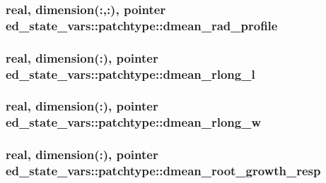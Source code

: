 \subsubsection[{\texorpdfstring{dmean\+\_\+rad\+\_\+profile}{dmean_rad_profile}}]{\setlength{\rightskip}{0pt plus 5cm}real, dimension(\+:,\+:), pointer ed\+\_\+state\+\_\+vars\+::patchtype\+::dmean\+\_\+rad\+\_\+profile}\hypertarget{structed__state__vars_1_1patchtype_a8aabb38e595edf404a57c53cf9128c8a}{}\label{structed__state__vars_1_1patchtype_a8aabb38e595edf404a57c53cf9128c8a}
\subsubsection[{\texorpdfstring{dmean\+\_\+rlong\+\_\+l}{dmean_rlong_l}}]{\setlength{\rightskip}{0pt plus 5cm}real, dimension(\+:), pointer ed\+\_\+state\+\_\+vars\+::patchtype\+::dmean\+\_\+rlong\+\_\+l}\hypertarget{structed__state__vars_1_1patchtype_a2c34274b4e10047a1940e79ca285d0f6}{}\label{structed__state__vars_1_1patchtype_a2c34274b4e10047a1940e79ca285d0f6}
\subsubsection[{\texorpdfstring{dmean\+\_\+rlong\+\_\+w}{dmean_rlong_w}}]{\setlength{\rightskip}{0pt plus 5cm}real, dimension(\+:), pointer ed\+\_\+state\+\_\+vars\+::patchtype\+::dmean\+\_\+rlong\+\_\+w}\hypertarget{structed__state__vars_1_1patchtype_a9e9e83d85741b0374632224fb8ee787e}{}\label{structed__state__vars_1_1patchtype_a9e9e83d85741b0374632224fb8ee787e}
\subsubsection[{\texorpdfstring{dmean\+\_\+root\+\_\+growth\+\_\+resp}{dmean_root_growth_resp}}]{\setlength{\rightskip}{0pt plus 5cm}real, dimension(\+:), pointer ed\+\_\+state\+\_\+vars\+::patchtype\+::dmean\+\_\+root\+\_\+growth\+\_\+resp}\hypertarget{structed__state__vars_1_1patchtype_a9ca81327ae7254b1afa8eeb50ee00b4a}{}\label{structed__state__vars_1_1patchtype_a9ca81327ae7254b1afa8eeb50ee00b4a}

